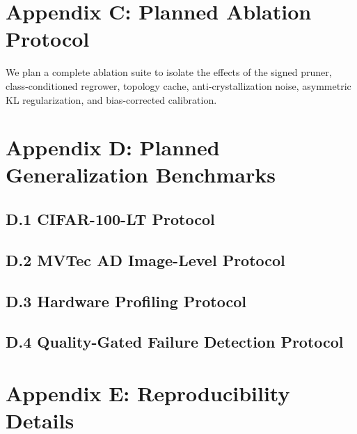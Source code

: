 \documentclass[letterpaper]{article} %
\begin{document}
\section{Appendix C: Planned Ablation Protocol}
We plan a complete ablation suite to isolate the effects of the signed pruner, class-conditioned regrower, topology cache, anti-crystallization noise, asymmetric KL regularization, and bias-corrected calibration.


\section{Appendix D: Planned Generalization Benchmarks}
\subsection{D.1 CIFAR-100-LT Protocol}

\subsection{D.2 MVTec AD Image-Level Protocol}
\subsection{D.3 Hardware Profiling Protocol}
\subsection{D.4 Quality-Gated Failure Detection Protocol}

\section{Appendix E: Reproducibility Details}
\end{document}

